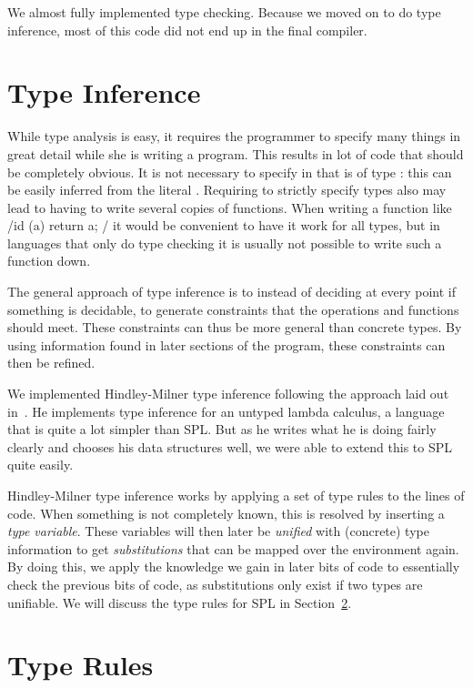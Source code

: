 We almost fully implemented type checking.
Because we moved on to do type inference, most of this code did not end up in the final compiler.

\section{Type Inference}

While type analysis is easy, it requires the programmer to specify many things in great detail while she is writing a program.
This results in lot of code that should be completely obvious.
It is not necessary to specify in  that  is of type : this can be easily inferred from the literal .
Requiring to strictly specify types also may lead to having to write several copies of functions.
When writing a function like \spl/id (a) { return a; }/ it would be convenient to have it work for all types, but in languages that only do type checking it is usually not possible to write such a function down.

The general approach of type inference is to instead of deciding at every point if something is decidable, to generate constraints that the operations and functions should meet.
These constraints can thus be more general than concrete types.
By using information found in later sections of the program, these constraints can then be refined.

We implemented Hindley-Milner type inference following the approach laid out in~\cite{writeyouahaskelltypeinf}.
He implements type inference for an untyped lambda calculus, a language that is quite a lot simpler than SPL\@.
But as he writes what he is doing fairly clearly and chooses his data structures well, we were able to extend this to SPL quite easily.

Hindley-Milner type inference works by applying a set of type rules to the lines of code.
When something is not completely known, this is resolved by inserting a \emph{type variable}.
These variables will then later be \emph{unified} with (concrete) type information to get \emph{substitutions} that can be mapped over the environment again.
By doing this, we apply the knowledge we gain in later bits of code to essentially check the previous bits of code, as substitutions only exist if two types are unifiable.
We will discuss the type rules for SPL in Section~\ref{sec:typerules}.

\section{Type Rules}\label{sec:typerules}

